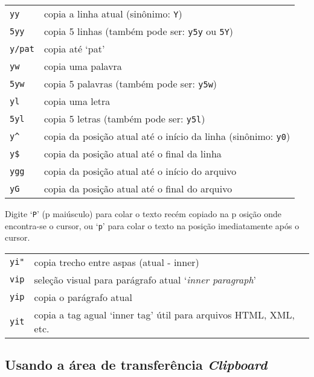 \begin{table}[htb]\begin{center} \begin{tabular}{ll} \hline
     \verb|yy|   & copia a linha atual (sinônimo: \verb|Y|)\\
     \verb|5yy| &  copia 5 linhas (também pode ser: \verb|y5y| ou \verb|5Y|)\\
     \verb|y/pat| &  copia até `pat'\\
     \verb|yw|  & copia uma palavra\\
     \verb|5yw| & copia 5 palavras (também pode ser: \verb|y5w|)\\
     \verb|yl|  & copia uma letra\\
     \verb|5yl| & copia 5 letras (também pode ser: \verb|y5l|)\\
     \verb|y^| & copia da posição atual até o início da linha (sinônimo: \verb|y0|)\\
     \verb|y$| & copia da posição atual até o final da linha\\
     \verb|ygg| & copia da posição atual até o início do arquivo\\
     \verb|yG| & copia da posição atual até o final do arquivo\\
\hline \end{tabular}\end{center}\end{table}

Digite `{\tt P}' (p maiúsculo) para colar o texto recém copiado na p
osição onde encontra-se o cursor, ou `{\tt p}' para colar o texto na posição 
imediatamente após o cursor.

\begin{table}[htb]\begin{center} \begin{tabular}{ll} \hline
     \verb|yi"| & copia trecho entre aspas (atual - inner) \\
     \verb|vip| & seleção visual para parágrafo atual `\textit{inner paragraph}'\\
     \verb|yip| & copia o parágrafo atual\\
     \verb|yit| & copia a tag agual `inner tag' útil para arquivos HTML, XML, etc.\\
\hline \end{tabular}\end{center}\end{table}

\subsection{Usando a área de transferência \textit{Clipboard}}

